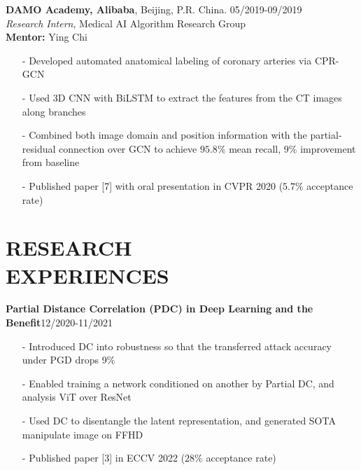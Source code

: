 \documentclass[margin]{res}
\begin{document}
\begin{resume}
                \vspace{-1em}  
                
                \textbf{DAMO Academy, Alibaba}, Beijing, P.R. China. \hfill 05/2019-09/2019\\
                {\it Research Intern}, Medical AI Algorithm Research Group\\
                \textbf{Mentor:} Ying Chi
                \begin{itemize}\itemsep -2.2pt %
                 \item[-] Developed automated anatomical labeling of coronary arteries via CPR-GCN
                 \item[-] Used 3D CNN with BiLSTM to extract the features from the CT images along branches
                 \item[-] Combined both image domain and position information with the partial-residual connection over GCN to achieve $95.8\%$ mean recall, $9\%$ improvement from baseline
                 \item[-] Published paper [7] with oral presentation in CVPR 2020 ($5.7\%$ acceptance rate)
                 \end{itemize}

\vspace{-1em}
\section{RESEARCH \\ EXPERIENCES}
				\textbf{Partial Distance Correlation (PDC) in Deep Learning and the Benefit}\hfill 12/2020-11/2021
                \begin{itemize}\itemsep -2.2pt %
                 \item[-] Introduced DC into robustness so that the transferred attack accuracy under PGD drops 9\%
                 \item[-] Enabled training a network conditioned on another by Partial DC, and analysis ViT over ResNet
                 \item[-] Used DC to disentangle the latent representation, and generated SOTA manipulate image on FFHD
                 \item[-] Published paper [3] in ECCV 2022 ($28\%$ acceptance rate)
                 \end{itemize}


\end{resume}
\end{document}
